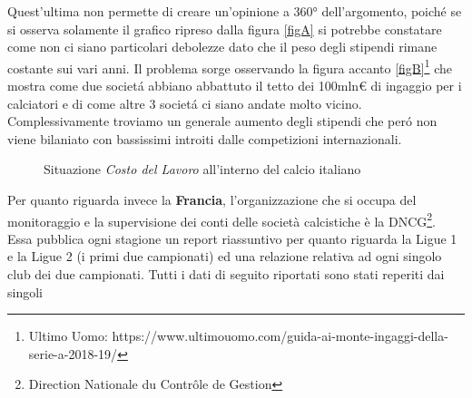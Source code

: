 \documentclass[
    corpo=12pt,
    oneside,
    evenboxes,
    tipotesi=triennale,
    stile=classica,
    oldstyle,
    autoretitolo,
    greek,
]{toptesi}
\begin{document}
\begin{interlinea}{1.5}
Quest'ultima non permette di creare un'opinione a 360° dell'argomento, poich\'e se si osserva solamente il grafico ripreso 
dalla figura \ref{figA} si potrebbe constatare come non ci siano particolari debolezze dato che il peso degli stipendi rimane costante sui vari anni. 
Il problema sorge osservando la figura accanto \ref{figB}\footnote{Ultimo Uomo: https://www.ultimouomo.com/guida-ai-monte-ingaggi-della-serie-a-2018-19/} 
che mostra come due societ\'a abbiano abbattuto il tetto dei 100mln€ di ingaggio per i calciatori e di come altre 3 societ\'a ci 
siano andate molto vicino. Complessivamente troviamo un generale aumento degli stipendi che per\'o non viene bilaniato con bassissimi introiti 
dalle competizioni internazionali.\newline
\begin{figure}
    \centering
     \quad
    \caption{Situazione \emph{Costo del Lavoro} all'interno del calcio italiano}
    \label{wage_serieA}  
\end{figure}\newline
Per quanto riguarda invece la \textbf{Francia}, l'organizzazione che si occupa del \linebreak monitoraggio e la supervisione dei conti 
delle società calcistiche è la DNCG\footnote{Direction Nationale du Contrôle de Gestion}. Essa 
pubblica ogni stagione un report riassuntivo per quanto riguarda la Ligue 1 e la Ligue 2 (i primi due campionati) ed una
relazione relativa ad ogni singolo club dei due campionati. Tutti i dati di seguito riportati sono stati reperiti dai singoli

\end{interlinea}
\end{document}
